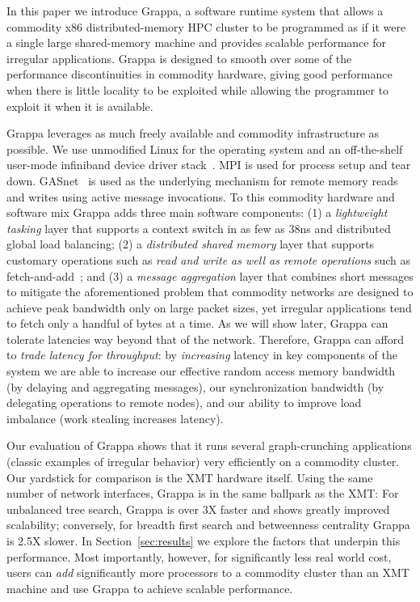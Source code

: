 In this paper we introduce Grappa, a software runtime system that allows
a commodity x86 distributed-memory HPC cluster to be programmed as if it
were a single large shared-memory machine and provides scalable
performance for irregular applications. Grappa is designed to smooth
over some of the performance discontinuities in commodity hardware,
giving good performance when there is little locality to be exploited
while allowing the programmer to exploit it when it is available. 

Grappa leverages as much freely available and commodity infrastructure as
possible. We use unmodified Linux for the operating system and an
off-the-shelf user-mode infiniband device driver stack~\cite{OFED}. MPI is
used for process setup and tear down. GASnet~\cite{gasnet} is used as the
underlying mechanism for remote memory reads and writes using active message
invocations. To this commodity hardware and software mix Grappa adds three
main software components: (1) a \emph{lightweight tasking} layer that supports
a context switch in as few as 38ns and distributed global load balancing; (2)
a \emph{distributed shared memory} layer that supports customary operations
such as \emph{read and write as well as remote operations} such as
fetch-and-add~\cite{fetchandadd}; and (3) a \emph{message aggregation} layer
that combines short messages to mitigate the aforementioned problem that
commodity networks are designed to achieve peak bandwidth only on large packet
sizes, yet irregular applications tend to fetch only a handful of bytes at a
time. As we will show later, Grappa can tolerate latencies way beyond that of
the network. Therefore, Grappa can afford to \emph{trade latency for
throughput}: by {\em increasing} latency in key components of the system we
are able to increase our effective random access memory bandwidth (by delaying and aggregating messages), our synchronization bandwidth (by delegating operations
to remote nodes), and our ability to improve load imbalance (work stealing
increases latency).

% 
% 

Our evaluation of Grappa shows that it runs several graph-crunching
applications (classic examples of irregular behavior) very efficiently
on a commodity cluster. Our yardstick for comparison is the XMT hardware
itself. Using the same number of network interfaces, Grappa is in the
same ballpark as the XMT: For unbalanced tree search, Grappa is over 3X
faster and shows greatly improved scalability; conversely, for breadth
first search and betweenness centrality Grappa is 2.5X slower.  In
Section~\ref{sec:results} we explore the factors that underpin this
performance. Most importantly, however, for significantly less real
world cost, users can \emph{add} significantly more processors to a
commodity cluster than an XMT machine and use Grappa to achieve scalable
performance.

% 


